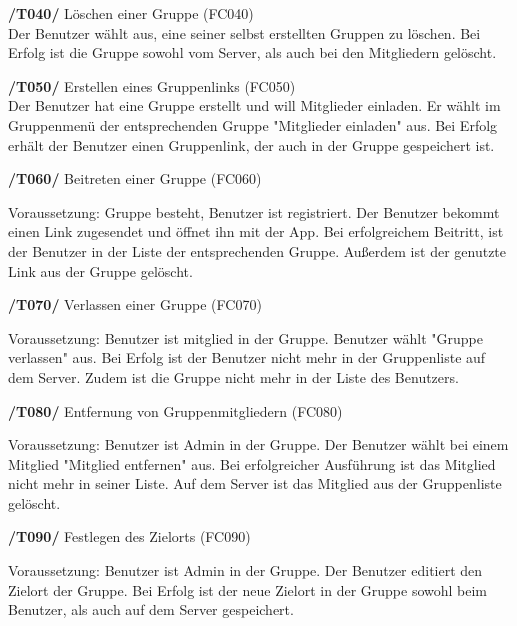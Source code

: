 \textbf{/T040/} Löschen einer Gruppe (FC040)\\
Der Benutzer wählt aus, eine seiner selbst erstellten Gruppen zu löschen.
Bei Erfolg ist die Gruppe sowohl vom Server, als auch bei den Mitgliedern gelöscht.
\begin{itemize}

\textbf{/T050/} Erstellen eines Gruppenlinks (FC050)\\
Der Benutzer hat eine Gruppe erstellt und will Mitglieder einladen.
Er wählt im Gruppenmenü der entsprechenden Gruppe "Mitglieder einladen" aus.
Bei Erfolg erhält der Benutzer einen Gruppenlink, der auch in der Gruppe gespeichert ist.
\begin{itemize}

\textbf{/T060/} Beitreten einer Gruppe (FC060)\\
\begin{itemize}
Voraussetzung: Gruppe besteht, Benutzer ist registriert.
Der Benutzer bekommt einen Link zugesendet und öffnet ihn mit der App.
Bei erfolgreichem Beitritt, ist der Benutzer in der Liste der entsprechenden Gruppe.
Außerdem ist der genutzte Link aus der Gruppe gelöscht.
\end{itemize}

\textbf{/T070/} Verlassen einer Gruppe (FC070)\\
\begin{itemize}
Voraussetzung: Benutzer ist mitglied in der Gruppe.
Benutzer wählt "Gruppe verlassen" aus.
Bei Erfolg ist der Benutzer nicht mehr in der Gruppenliste auf dem Server.
Zudem ist die Gruppe nicht mehr in der Liste des Benutzers.
\end{itemize}

\textbf{/T080/} Entfernung von Gruppenmitgliedern (FC080)\\
\begin{itemize}
Voraussetzung: Benutzer ist Admin in der Gruppe.
Der Benutzer wählt bei einem Mitglied "Mitglied entfernen" aus.
Bei erfolgreicher Ausführung ist das Mitglied nicht mehr in seiner Liste.
Auf dem Server ist das Mitglied aus der Gruppenliste gelöscht.
\end{itemize}

\textbf{/T090/} Festlegen des Zielorts (FC090)\\
\begin{itemize}
Voraussetzung: Benutzer ist Admin in der Gruppe.
Der Benutzer editiert den Zielort der Gruppe.
Bei Erfolg ist der neue Zielort in der Gruppe sowohl beim Benutzer,
als auch auf dem Server gespeichert.
\end{itemize}


\end{itemize}
\end{itemize}
